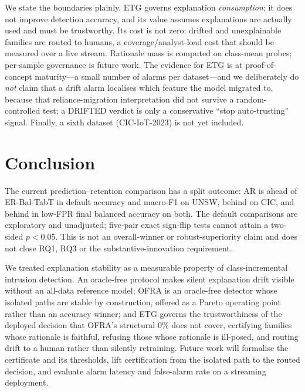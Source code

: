 \documentclass[conference]{IEEEtran}
\begin{document}
We state the boundaries plainly. ETG governs explanation \emph{consumption}; it
does not improve detection accuracy, and its value assumes explanations are
actually used and must be trustworthy. Its cost is not zero: drifted and
unexplainable families are routed to humans, a coverage/analyst-load cost that
should be measured over a live stream. Rationale mass is computed on class-mean
probes; per-sample governance is future work. The evidence for ETG is at
proof-of-concept maturity---a small number of alarms per dataset---and we
deliberately do \emph{not} claim that a drift alarm localises which feature the
model migrated to, because that reliance-migration interpretation did not survive
a random-controlled test; a \textsf{DRIFTED} verdict is only a conservative
``stop auto-trusting'' signal. Finally, a sixth dataset (CIC-IoT-2023) is not yet
included.

\section{Conclusion}
The current prediction--retention comparison has a split outcome: AR is ahead of ER-Bal-TabT in default accuracy and macro-F1 on UNSW, behind on CIC, and behind in low-FPR final balanced accuracy on both. The default comparisons are exploratory and unadjusted; five-pair exact sign-flip tests cannot attain a two-sided $p<0.05$. This is not an overall-winner or robust-superiority claim and does not close RQ1, RQ3 or the substantive-innovation requirement.
\label{sec:conclusion}

We treated explanation stability as a measurable property of class-incremental
intrusion detection. An oracle-free protocol makes silent explanation drift
visible without an all-data reference model; OFRA is an oracle-free detector
whose isolated paths are stable by construction, offered as a Pareto operating
point rather than an accuracy winner; and ETG governs the trustworthiness of the
deployed decision that OFRA's structural $0\%$ does not cover, certifying
families whose rationale is faithful, refusing those whose rationale is ill-posed,
and routing drift to a human rather than silently retraining. Future work will
formalise the certificate and its thresholds, lift certification from the isolated
path to the routed decision, and evaluate alarm latency and false-alarm rate on a
streaming deployment.
\end{document}

